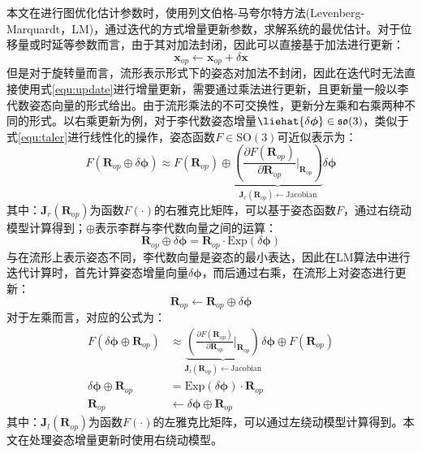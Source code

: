 \section{}
\label{appendix:lie_alg_update}
本文在进行图优化估计参数时，使用列文伯格-马夸尔特方法(Levenberg-Marquardt，LM)，通过迭代的方式增量更新参数，求解系统的最优估计。对于位移量或时延等参数而言，由于其对加法封闭，因此可以直接基于加法进行更新：
\begin{equation}
  \label{equ:update}
  \boldsymbol{x}_{op}\gets\boldsymbol{x}_{op}+\delta\boldsymbol{x}
\end{equation}
但是对于旋转量而言，流形表示形式下的姿态对加法不封闭，因此在迭代时无法直接使用式\ref{equ:update}进行增量更新，需要通过乘法进行更新，且更新量一般以李代数姿态向量的形式给出。由于流形乘法的不可交换性，更新分左乘和右乘两种不同的形式。以右乘更新为例，对于李代数姿态增量$\liehat{\delta\boldsymbol{\phi}}\in\mathfrak{so}(3)$，类似于式\ref{equ:taler}进行线性化的操作，姿态函数$F\in\mathrm{SO(3)}$可近似表示为：
\begin{equation}
  F(\boldsymbol{R}_{op}\oplus\delta\boldsymbol{\phi}) \approx
  F(\boldsymbol{R}_{op})\oplus\underbrace{\left( \frac{{\partial F(\boldsymbol{R}_{op})}}{\partial \boldsymbol{R}_{op}}\bigg|_{\boldsymbol{R}_{op}} \right) }_{\boldsymbol{J}_r(\boldsymbol{R}_{op})\gets\mathrm{Jacobian}}\delta\boldsymbol{\phi}
\end{equation}
其中：$\boldsymbol{J}_r(\boldsymbol{R}_{op})$为函数$F(\cdot)$的右雅克比矩阵，可以基于姿态函数$F$，通过右绕动模型计算得到\cite{sola2018micro}；$\oplus$表示李群与李代数向量之间的运算：
\begin{equation*}
  \boldsymbol{R}_{op}\oplus\delta\boldsymbol{\phi}=\boldsymbol{R}_{op}\cdot\mathrm{Exp}(\delta\boldsymbol{\phi})
\end{equation*}
与在流形上表示姿态不同，李代数向量是姿态的最小表达，因此在LM算法中进行迭代计算时，首先计算姿态增量向量$\delta\boldsymbol{\phi}$，而后通过右乘，在流形上对姿态进行更新：
\begin{equation}
  \boldsymbol{R}_{op}\gets\boldsymbol{R}_{op}\oplus\delta\boldsymbol{\phi}
\end{equation}
对于左乘而言，对应的公式为：
\begin{equation}
  \begin{aligned}
    F(\delta\boldsymbol{\phi}\oplus\boldsymbol{R}_{op}) & \approx
    \underbrace{\left( \frac{{\partial F(\boldsymbol{R}_{op})}}{\partial \boldsymbol{R}_{op}}\bigg|_{\boldsymbol{R}_{op}} \right) }_{\boldsymbol{J}_l(\boldsymbol{R}_{op})\gets\mathrm{Jacobian}}\delta\boldsymbol{\phi}\oplus
    F(\boldsymbol{R}_{op})                                                                                               \\
    \delta\boldsymbol{\phi}\oplus\boldsymbol{R}_{op}    & =\mathrm{Exp}(\delta\boldsymbol{\phi})\cdot\boldsymbol{R}_{op} \\
    \boldsymbol{R}_{op}                                 & \gets\delta\boldsymbol{\phi}\oplus\boldsymbol{R}_{op}
  \end{aligned}
\end{equation}
其中：$\boldsymbol{J}_l(\boldsymbol{R}_{op})$为函数$F(\cdot)$的左雅克比矩阵，可以通过左绕动模型计算得到。本文在处理姿态增量更新时使用右绕动模型。

